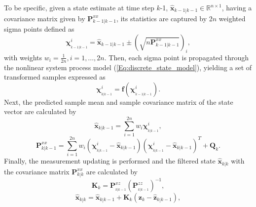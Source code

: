 \documentclass[10pt]{IEEEtran}
\begin{document}
To be specific, given a state estimate at time step $k$-1, ${\bm{\widehat {x}}_{k - 1\left| {k - 1} \right.}}\in \mathbb{R}^{n\times 1}$, having a covariance matrix given by ${\bm{P}_{k - 1|{k - 1}}^{xx}}$, its statistics are captured by 2$n$ weighted sigma points defined as
\begin{equation}
\bm{\chi} _{_{k - 1\left| {k - 1} \right.}}^i = {\bm{\widehat x}_{k - 1\left| {k - 1} \right.}} \pm {\left( {\sqrt {n{\bm{P}_{k - 1\left| {k - 1} \right.}^{xx}}} } \right)_i},
\label{Eq:sigma_points1}
\end{equation}
with weights ${w_i} = \frac{1}{{2n}},i=1,...,2n$. Then, each sigma point is propagated through the nonlinear system process model (\ref{Eq:discrete_state_model}), yielding a set of transformed samples expressed as
\begin{equation}
\bm{\chi}_{_{k\left| {k - 1} \right.}}^i = \bm{f}\left( {\bm{\chi}_{_{k - 1\left| {k - 1} \right.}}^i} \right).
\label{Eq:propagated_sigma_points}
\end{equation}
Next, the predicted sample mean and sample covariance matrix of the state vector are calculated by
\begin{equation}
{\bm{\widehat x}_{k\left| {k - 1} \right.}} = \sum\limits_{i = 1}^{2n} {{w_i}} \bm{\chi}_{_{k\left| {k - 1} \right.}}^i,
\label{Eq:propagated_sigma_points_mean}
\end{equation}
\vspace{-0.3cm}
\begin{equation}
{\bm{P}_{k| {k - 1}}^{xx}} = \sum\limits_{i = 1}^{2n} {{w_i}}( {\bm{\chi}_{_{k| {k - 1}}}^i - {{\bm{\widehat x}}_{k| {k - 1}}}}){( {\bm{\chi}_{_{k|{k - 1}}}^i - {{\bm{\widehat x}}_{k|{k - 1}}}})^T}+\bm{Q}_k.
\label{Eq:propagated_sigma_points_covariance}
\end{equation}
Finally, the measurement updating is performed and the filtered state ${\bm{\widehat x}_{k\left| k \right.}}$ with the covariance matrix ${\bm{P}_{k\left| k \right.}^{xx}}$ are calculated by
\begin{equation}
{\bm{K}_k} = \bm{P}_{_{k\left| {k - 1} \right.}}^{xz}{\left( {\bm{P}_{_{k\left| {k - 1} \right.}}^{zz}} \right)^{ - 1}},
\label{Eq:ukf_gain}
\end{equation}
\begin{equation}
{\bm{\widehat x}_{k\left| k \right.}} = {\bm{\widehat x}_{k\left| {k - 1} \right.}} + {\bm{K}_k}\left( {{\bm{z}_{k}} - {{\bm{\widehat z}}_{k\left| {k - 1} \right.}}} \right),
\label{Eq:ukf_filtering}
\end{equation}
\end{document}
